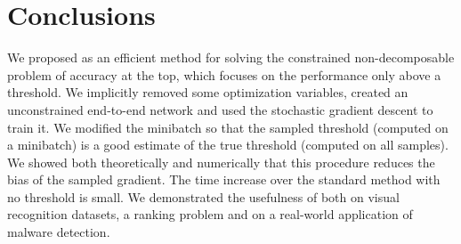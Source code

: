 \section{Conclusions}

We proposed \DeepTopPush as an efficient method for solving the constrained non-decomposable problem of accuracy at the top, which focuses on the performance only above a threshold. We implicitly removed some optimization variables, created an unconstrained end-to-end network and used the stochastic gradient descent to train it. We modified the minibatch so that the sampled threshold (computed on a minibatch) is a good estimate of the true threshold (computed on all samples). We showed both theoretically and numerically that this procedure reduces the bias of the sampled gradient. The time increase over the standard method with no threshold is small. We demonstrated the usefulness of \DeepTopPush both on visual recognition datasets, a ranking problem and on a real-world application of malware detection.
